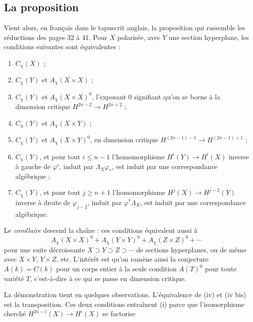 \documentclass[11pt,a4paper]{article}
\begin{document}
\subsection*{La proposition}

Vient alors, en français dans le tapuscrit anglais, la proposition qui
rassemble les réductions des pages 32 à 41. Pour $X$ polarisée, avec $Y$ une
section hyperplane, les conditions suivantes sont équivalentes :

\begin{enumerate}
  \item[(i)] $C_{\chi}(X)$ ;
  \item[(ii)] $C_{\chi}(Y)$ et $A_{\chi}(X \times X)$ ;
  \item[(ii bis)] $C_{\chi}(Y)$ et $A_{\chi}(X \times X)^{0}$, l'exposant $0$
  signifiant qu'on se borne à la dimension critique
  $H^{2n-2} \to H^{2n+2}$ ;
  \item[(iii)] $C_{\chi}(Y)$ et $A_{\chi}(X \times Y)$ ;
  \item[(iii bis)] $C_{\chi}(Y)$ et $A_{\chi}(X \times Y)^{0}$, en dimension
  critique $H^{(2n-1)-1} \to H^{(2n-1)+1}$ ;
  \item[(iv)] $C_{\chi}(Y)$, et pour tout $i \leqslant n-1$ l'homomorphisme
  $H^{i}(Y) \to H^{i}(X)$ inverse à gauche de $\varphi^{i}$, induit par
  $\Lambda_{X}\varphi_{*}$, est induit par une correspondance algébrique ;
  \item[(iv bis)] $C_{\chi}(Y)$, et pour tout $j \geqslant n+1$ l'homomorphisme
  $H^{j}(X) \to H^{j-2}(Y)$ inverse à droite de $\varphi_{j-2}$, induit par
  $\varphi^{*}\Lambda_{X}$, est induit par une correspondance algébrique.
\end{enumerate}

Le \emph{corollaire} descend la chaîne : ces conditions équivalent aussi à
\[
A_{\chi}(X \times X)^{0} + A_{\chi}(Y \times Y)^{0} + A_{\chi}(Z \times Z)^{0} + \cdots
\]
pour une suite décroissante $X \supset Y \supset Z \supset \cdots$ de sections
hyperplanes, ou de même avec $X \times Y$, $Y \times Z$, etc. L'intérêt est
qu'on ramène ainsi la conjecture $A(k) = C(k)$ pour un corps entier à la seule
condition $A(T)^{0}$ pour toute variété $T$, c'est-à-dire à ce qui se passe en
dimension critique.

La démonstration tient en quelques observations. L'équivalence de (iv) et
(iv bis) est la transposition. Ces deux conditions entraînent (i) parce que
l'isomorphisme cherché $H^{2n-i}(X) \to H^{i}(X)$ se factorise

\end{document}
